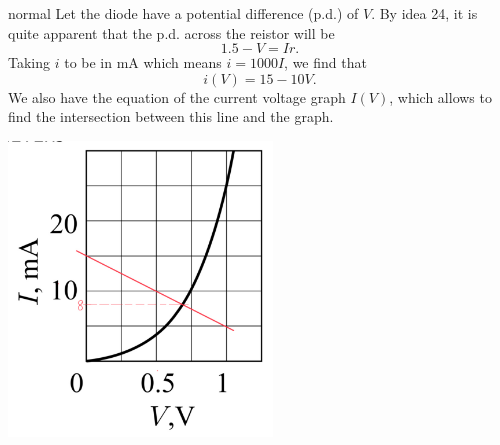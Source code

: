 \begin{solution}{normal}
Let the diode have a potential difference (p.d.) of $V$. By idea 24, it is quite apparent that the p.d. across the reistor will be 
\[1.5 - V = I r.\]
Taking $i$ to be in mA which means $i = 1000 I$, we find that 
\[i (V) = 15 - 10 V.\]
We also have the equation of the current voltage graph $I(V)$, which allows to find the intersection between this line and the graph. 
\begin{center}
    \includegraphics[width=7cm]{49B62025-1343-4881-9854-3AF244D6DE23.jpeg}
\end{center}
\end{solution}